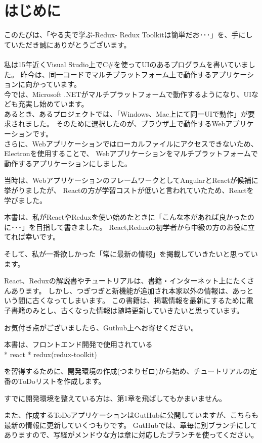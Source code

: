 \chapter{はじめに}
\label{chap:00-preface}

このたびは、「やる夫で学ぶ{-}Redux{-} Redux Toolkitは簡単だお･･･」を、手にしていただき誠にありがとうございます。
\\[0pt]
\\[0pt]
私は15年近くVisual Studio上でC\#を使ってUIのあるプログラムを書いていました。
昨今は、同一コードでマルチプラットフォーム上で動作するアプリケーションに向かっています。
\\[0pt]
今では、Microsoft .NETがマルチプラットフォームで動作するようになり、UIなども充実し始めています。
\\[0pt]
あるとき、あるプロジェクトでは、「Windows、Mac上にて同一UIで動作」が要求されました。
そのために選択したのが、ブラウザ上で動作するWebアプリケーションです。
\\[0pt]
さらに、Webアプリケーションではローカルファイルにアクセスできないため、Electronを使用することで、
Webアプリケーションをマルチプラットフォームで動作するアプリケーションにしました。

当時は、WebアプリケーションのフレームワークとしてAngularとReactが候補に挙がりましたが、
Reactの方が学習コストが低いと言われていたため、Reactを学びました。

本書は、私がReactやReduxを使い始めたときに「こんな本があれば良かったのに･･･」を目指して書きました。
React,Reduxの初学者から中級の方のお役に立てれば幸いです。

そして、私が一番欲しかった「常に最新の情報」を掲載していきたいと思っています。

React、Reduxの解説書やチュートリアルは、書籍・インターネット上にたくさんあります。
しかし、つぎつぎと新機能が追加され本家以外の情報は、あっという間に古くなってしまいます。
この書籍は、掲載情報を最新にするために電子書籍のみとし、古くなった情報は随時更新していきたいと思っています。

お気付き点がございましたら、Guthub上へお寄せください。

本書は、フロントエンド開発で使用されている\\[0pt]
* react
* redux(redux{-}toolkit)

を習得するために、開発環境の作成(つまりゼロ)から始め、チュートリアルの定番のToDoリストを作成します。

すでに開発環境を整えている方は、第1章を飛ばしてもかまいません。

また、作成するToDoアプリケーションはGutHubに公開していますが、こちらも最新の情報に更新していくつもりです。
GutHubでは、章毎に別ブランチにしてありますので、写経がメンドウな方は章に対応したブランチを使ってください。

